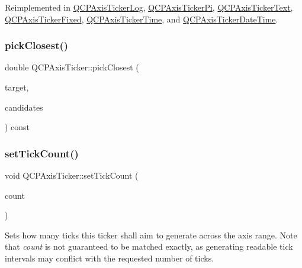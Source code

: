 Reimplemented in \mbox{\hyperlink{class_q_c_p_axis_ticker_log_a57be974214a065d3247406331f02fa49}{Q\+C\+P\+Axis\+Ticker\+Log}}, \mbox{\hyperlink{class_q_c_p_axis_ticker_pi_a55301f0072983bd2d7c131a24e1779e7}{Q\+C\+P\+Axis\+Ticker\+Pi}}, \mbox{\hyperlink{class_q_c_p_axis_ticker_text_a628f16c41905e8c95c6622d6757a38c4}{Q\+C\+P\+Axis\+Ticker\+Text}}, \mbox{\hyperlink{class_q_c_p_axis_ticker_fixed_a9e99da01ab92a86aed415eef32fed13a}{Q\+C\+P\+Axis\+Ticker\+Fixed}}, \mbox{\hyperlink{class_q_c_p_axis_ticker_time_a5615064642090fe193797caea8b98cb4}{Q\+C\+P\+Axis\+Ticker\+Time}}, and \mbox{\hyperlink{class_q_c_p_axis_ticker_date_time_a0560c14a3f87bb99ab136aca8321b32a}{Q\+C\+P\+Axis\+Ticker\+Date\+Time}}.

\mbox{\label{class_q_c_p_axis_ticker_a4ea0a7c4ca1c610f92b9bd5944ab4260}} 
\subsubsection{\texorpdfstring{pickClosest()}{pickClosest()}}
{\footnotesize\ttfamily double Q\+C\+P\+Axis\+Ticker\+::pick\+Closest (\begin{DoxyParamCaption}\item[{double}]{target,  }\item[{const Q\+Vector$<$ double $>$ \&}]{candidates }\end{DoxyParamCaption}) const\hspace{0.3cm}{\ttfamily [protected]}}

\mbox{\label{class_q_c_p_axis_ticker_a47752abba8293e6dc18491501ae34008}} 
\subsubsection{\texorpdfstring{setTickCount()}{setTickCount()}}
{\footnotesize\ttfamily void Q\+C\+P\+Axis\+Ticker\+::set\+Tick\+Count (\begin{DoxyParamCaption}\item[{int}]{count }\end{DoxyParamCaption})}

Sets how many ticks this ticker shall aim to generate across the axis range. Note that {\itshape count} is not guaranteed to be matched exactly, as generating readable tick intervals may conflict with the requested number of ticks.

